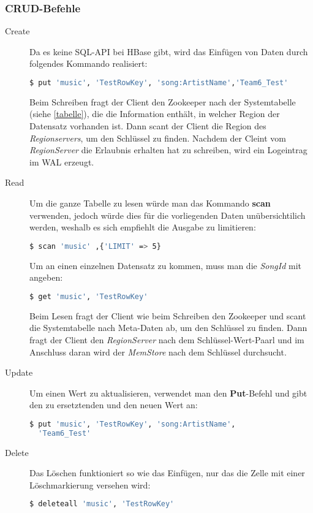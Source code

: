 \subsubsection{CRUD-Befehle}
\begin{description}
\item[Create] Da es keine SQL-API bei HBase gibt, wird das Einfügen von Daten durch folgendes Kommando realisiert:
\begin{lstlisting}[language=bash]
  $ put 'music', 'TestRowKey', 'song:ArtistName','Team6_Test'
\end{lstlisting}
Beim Schreiben fragt der Client den Zookeeper nach der Systemtabelle (siehe \ref{tabelle}), die die Information enthält, in welcher Region der Datensatz vorhanden ist. Dann scant der Client die Region des \textit{Regionservers}, um den Schlüssel zu finden.
Nachdem der Cleint vom \textit{RegionServer} die Erlaubnis erhalten hat zu schreiben, wird ein Logeintrag im \ac{WAL} erzeugt.
\item[Read] Um die ganze Tabelle zu lesen würde man das Kommando \textbf{scan} verwenden, jedoch würde dies für die vorliegenden Daten unübersichtilich werden, weshalb es sich empfiehlt die Ausgabe zu limitieren:
\begin{lstlisting}[language=bash]
  $ scan 'music' ,{'LIMIT' => 5}
\end{lstlisting}
Um an einen einzelnen Datensatz zu kommen, muss man die \textit{SongId} mit angeben:
\begin{lstlisting}[language=bash]
  $ get 'music', 'TestRowKey'
\end{lstlisting}
Beim Lesen fragt der Client wie beim Schreiben den Zookeeper und scant die Systemtabelle nach Meta-Daten ab, um den Schlüssel zu finden. Dann fragt der Client den \textit{RegionServer} nach dem Schlüssel-Wert-Paarl und im Anschluss daran wird der \textit{MemStore}
nach dem Schlüssel durchsucht.
\item[Update] Um einen Wert zu aktualisieren, verwendet man den \textbf{Put}-Befehl und gibt den zu ersetztenden und den neuen Wert an:
\begin{lstlisting}[language=bash]
  $ put 'music', 'TestRowKey', 'song:ArtistName',
  'Team6_Test'
\end{lstlisting}
\item[Delete] Das Löschen funktioniert so wie das Einfügen, nur das die Zelle mit einer Löschmarkierung versehen wird: 
\begin{lstlisting}[language=bash]
  $ deleteall 'music', 'TestRowKey'
\end{lstlisting}
\end{description}



